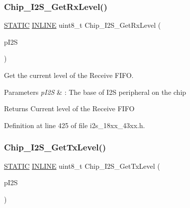 \subsubsection{\texorpdfstring{Chip\+\_\+\+I2\+S\+\_\+\+Get\+Rx\+Level()}{Chip\_I2S\_GetRxLevel()}}
{\footnotesize\ttfamily \hyperlink{group___l_p_c___types___public___macros_ga10b2d890d871e1489bb02b7e70d9bdfb}{S\+T\+A\+T\+IC} \hyperlink{spifi__18xx__43xx_8h_a2eb6f9e0395b47b8d5e3eeae4fe0c116}{I\+N\+L\+I\+NE} uint8\+\_\+t Chip\+\_\+\+I2\+S\+\_\+\+Get\+Rx\+Level (\begin{DoxyParamCaption}\item[{\hyperlink{struct_l_p_c___i2_s___t}{L\+P\+C\+\_\+\+I2\+S\+\_\+T} $\ast$}]{p\+I2S }\end{DoxyParamCaption})}



Get the current level of the Receive F\+I\+FO. 


\begin{DoxyParams}{Parameters}
{\em p\+I2S} & \+: The base of I2S peripheral on the chip \\
\hline
\end{DoxyParams}
\begin{DoxyReturn}{Returns}
Current level of the Receive F\+I\+FO 
\end{DoxyReturn}


Definition at line 425 of file i2s\+\_\+18xx\+\_\+43xx.\+h.

\mbox{\label{group___i2_s__18_x_x__43_x_x_ga125559c7f810a2564f5b6059ead42256}} 
\subsubsection{\texorpdfstring{Chip\+\_\+\+I2\+S\+\_\+\+Get\+Tx\+Level()}{Chip\_I2S\_GetTxLevel()}}
{\footnotesize\ttfamily \hyperlink{group___l_p_c___types___public___macros_ga10b2d890d871e1489bb02b7e70d9bdfb}{S\+T\+A\+T\+IC} \hyperlink{spifi__18xx__43xx_8h_a2eb6f9e0395b47b8d5e3eeae4fe0c116}{I\+N\+L\+I\+NE} uint8\+\_\+t Chip\+\_\+\+I2\+S\+\_\+\+Get\+Tx\+Level (\begin{DoxyParamCaption}\item[{\hyperlink{struct_l_p_c___i2_s___t}{L\+P\+C\+\_\+\+I2\+S\+\_\+T} $\ast$}]{p\+I2S }\end{DoxyParamCaption})}



